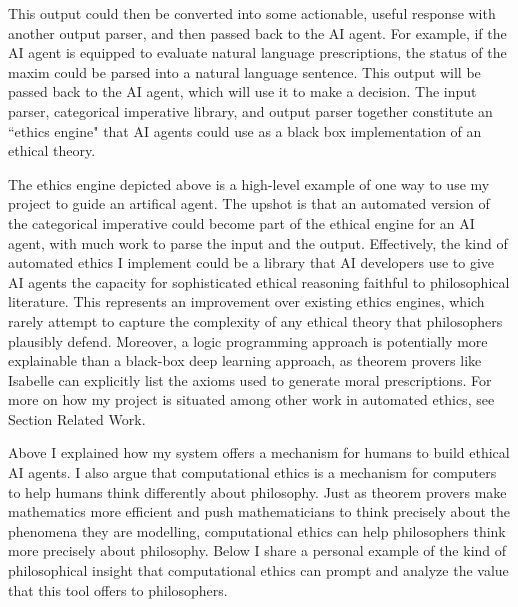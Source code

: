 \begin{isabellebody}
\begin{isamarkuptext}
This output could then be converted into some actionable, useful response with another output parser, 
and then passed back to the AI agent. For example, if the AI agent is equipped to evaluate natural language prescriptions, the 
status of the maxim could be parsed into a natural language sentence. This output will be passed back 
to the AI agent, which will use it to make a decision. The input parser, categorical imperative library, 
and output parser together constitute an ``ethics engine" that AI agents could use as a black box 
implementation of an ethical theory. 

The ethics engine depicted above is a high-level example of one way to use my project to guide an artifical agent. The 
upshot is that an automated version of the categorical imperative could become part of the ethical engine 
for an AI agent, with much work to parse the input and the output. Effectively, the kind 
of automated ethics I implement could be a library that AI developers use to give AI agents the capacity for 
sophisticated ethical reasoning faithful to philosophical literature. This represents an improvement 
over existing ethics engines, which rarely attempt to capture the complexity 
of any ethical theory that philosophers plausibly defend. Moreover, a logic programming approach 
is potentially more explainable than a black-box deep learning approach, as theorem provers like 
Isabelle can explicitly list the axioms used to generate moral prescriptions. For more on how my project 
is situated among other work in automated ethics, see Section Related Work.%
\end{isamarkuptext}\isamarkuptrue%
%
\isadelimdocument
%
\endisadelimdocument
%
\isatagdocument
%
\isamarkuptrue%
%
\endisatagdocument
{\isafolddocument}%
%
\isadelimdocument
%
\endisadelimdocument
%
\begin{isamarkuptext}%
Above I explained how my system offers a mechanism for humans to build ethical AI agents. I also 
argue that computational ethics is a mechanism for computers to help humans think differently about 
philosophy. Just as theorem provers make mathematics more efficient and push mathematicians to think 
precisely about the phenomena they are modelling, computational ethics can help philosophers think more precisely about 
philosophy. Below I share a personal example of the kind of philosophical insight that computational ethics 
can prompt and analyze the value that this tool offers to philosophers.%
\end{isamarkuptext}\isamarkuptrue%

\end{isabellebody}
